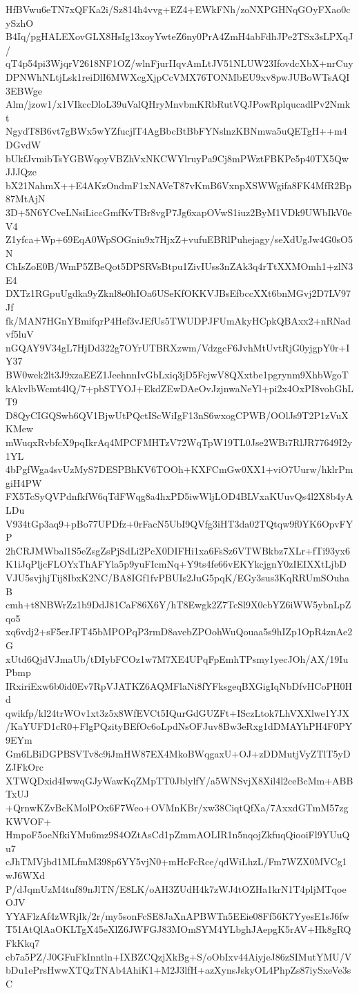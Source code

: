 HfBVwu6eTN7xQFKa2i/Sz814h4vvg+EZ4+EWkFNh/zoNXPGHNqGOyFXao0cySzhO
B4Iq/pgHALEXovGLX8HsIg13xoyYwteZ6ny0PrA4ZmH4abFdhJPe2TSx3sLPXqJ/
qT4p54pi3WjqrV2618NF1OZ/wlnFjurIIqvAmLtJV51NLUW23IfovdcXbX+nrCuy
DPNWhNLtjLsk1reiDlI6MWXcgXjpCcVMX76TONMbEU9xv8pwJUBoWTsAQI3EBWge
Alm/jzow1/x1VIkccDloL39uValQHryMnvbmKRbRutVQJPowRplqucadlPv2Nmkt
NgydT8B6vt7gBWx5wYZfucjlT4AgBbcBtBbFYNslnzKBNmwa5uQETgH++m4DGvdW
bUkfJvmibTsYGBWqoyVBZhVxNKCWYlruyPa9Cj8mPWztFBKPe5p40TX5QwJJJQze
bX21NahmX++E4AKzOndmF1xNAVeT87vKmB6VxnpXSWWgifa8FK4MfR2Bp87MtAjN
3D+5N6YCveLNsiLiccGmfKvTBr8vgP7Jg6xapOVwS1iuz2ByM1VDk9UWbIkV0eV4
Z1yfca+Wp+69EqA0WpSOGniu9x7HjxZ+vufuEBRlPuhejagy/seXdUgJw4G0sO5N
ChIsZoE0B/WmP5ZBeQot5DPSRVsBtpu1ZivIUss3nZAk3q4rTtXXMOmh1+zlN3E4
DXTz1RGpuUgdka9yZknl8e0hIOa6USeKfOKKVJBsEfbccXXt6bnMGvj2D7LV97Jf
fk/MAN7HGnYBmifqrP4Hef3vJEfUs5TWUDPJFUmAkyHCpkQBAxx2+nRNadvf5luV
nGQAY9V34gL7HjDd322g7OYrUTBRXzwm/VdzgcF6JvhMtUvtRjG0yjgpY0r+IY37
BW0wek2lt3J9xzaEEZ1JeehnnIvGbLxiq3jD5FcjwV8QXxtbe1pgrynm9XhbWgoT
kAkvlbWcmt4lQ/7+pbSTYOJ+EkdZEwDAeOvJzjnwaNeYl+pi2x4OxPI8vohGhLT9
D8QyCIGQSwb6QV1BjwUtPQctIScWiIgF13nS6wxogCPWB/OOlJs9T2P1zVuXKMew
mWuqxRvbfcX9pqIkrAq4MPCFMHTzV72WqTpW19TL0Jse2WBi7RlJR77649I2y1YL
4bPgfWga4svUzMyS7DESPBhKV6TOOh+KXFCmGw0XX1+viO7Uurw/hklrPmgiH4PW
FX5TcSyQVPdnfkfW6qTdFWqg8a4hxPD5iwWljLOD4BLVxaKUuvQs4l2X8b4yALDu
V934tGp3aq9+pBo77UPDfz+0rFacN5UbI9QVfg3iHT3da02TQtqw9f0YK6OpvFYP
2hCRJMWbal1S5eZsgZsPjSdLi2PcX0DIFHi1xa6FsSz6VTWBkbz7XLr+fTi93yx6
K1iJqPljcFLOYxThAFYla5p9yuFIcmNq+Y9ts4fe66vEKYkcjgnY0zIEIXXtLjbD
VJU5svjhjTij8IbxK2NC/BA8IGf1fvPBUIs2JuG5pqK/EGy3sus3KqRRUmSOuhaB
cmh+t8NBWrZz1b9DdJ81CaF86X6Y/hT8Ewgk2Z7TcSl9X0cbYZ6iWW5ybnLpZqo5
xq6vdj2+sF5erJFT45bMPOPqP3rmD8avebZPOohWuQouaa5s9hIZp1OpR4znAe2G
xUtd6QjdVJmaUb/tDIybFCOz1w7M7XE4UPqFpEmhTPsmy1yecJOh/AX/19IuPbmp
IRxiriExw6b0id0Ev7RpVJATKZ6AQMFlaNi8fYFksgeqBXGigIqNbDfvHCoPH0Hd
qwikfp/kl24trWOv1xt3z5x8WfEVCt5IQurGdGUZFt+ISczLtok7LhVXXlwe1YJX
/KaYUFD1cR0+FlgPQzityBEfOc6oLpdNsOFJuv8Bw3eRxg1dDMAYhPH4F0PY9EYm
Gm6LBiDGPBSVTv8c9iJmHW87EX4MkoBWqgaxU+OJ+zDDMutjVyZTlT5yDZJFkOrc
XTWQDxid4IwwqGJyWawKqZMpTT0JblylfY/a5WNSvjX8Xil4l2ceBcMm+ABBTxUJ
+QrnwKZvBcKMolPOx6F7Weo+OVMnKBr/xw38CiqtQfXa/7AxxdGTmM57zgKWVOF+
HmpoF5oeNfkiYMu6mz9S4OZtAsCd1pZmmAOLIR1n5nqojZkfuqQiooiFl9YUuQu7
cJhTMVjbd1MLfmM398p6YY5vjN0+mHcFcRce/qdWiLhzL/Fm7WZX0MVCg1wJ6WXd
P/dJqmUzM4tuf89nJlTN/E8LK/oAH3ZUdH4k7zWJ4tOZHa1krN1T4pljMTqoeOJV
YYAFlzAf4zWRjlk/2r/my5sonFcSE8JaXnAPBWTn5EEie08Ff56K7YyesE1sJ6fw
T51AtQlAaOKLTgX45eXlZ6JWFGJ83MOmSYM4YLbghJAepgK5rAV+Hk8gRQFkKkq7
cb7a5PZ/J0GFuFkInntln+IXBZCQzjXkBg+S/oObIxv44AiyjeJ86zSIMutYMU/V
bDu1ePrsHwwXTQzTNAb4AhiK1+M2J3lfH+azXynsJskyOL4PhpZs87iySxeVe3sC
